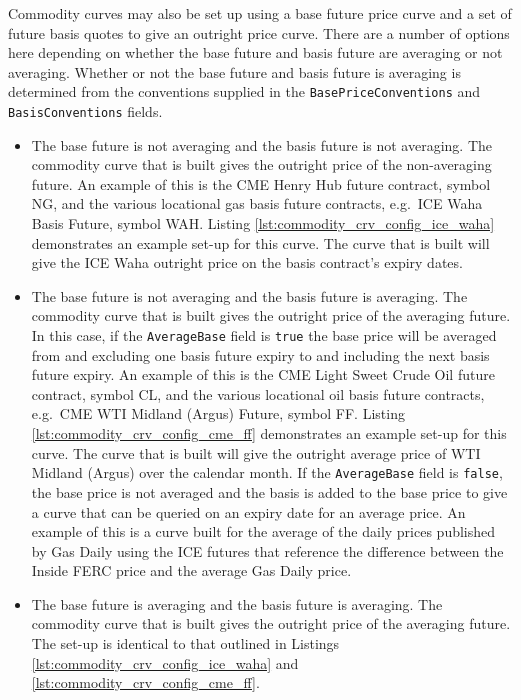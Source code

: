 \documentclass[12pt, a4paper]{article}
\begin{document}
{{Commodity curves may also be set up using a base future price curve and a set of future basis quotes to give an outright price curve. There are a number of options here depending on whether the base future and basis future are averaging or not averaging. Whether or not the base future and basis future is averaging is determined from the conventions supplied in the \lstinline!BasePriceConventions! and \lstinline!BasisConventions! fields. 
\begin{itemize}
\item
The base future is not averaging and the basis future is not averaging. The commodity curve that is built gives the outright price of the non-averaging future. An example of this is the CME Henry Hub future contract, symbol NG, and the various locational gas basis future contracts, e.g.\ ICE Waha Basis Future, symbol WAH. Listing \ref{lst:commodity_crv_config_ice_waha} demonstrates an example set-up for this curve. The curve that is built will give the ICE Waha outright price on the basis contract's expiry dates.

\item
The base future is not averaging and the basis future is averaging. The commodity curve that is built gives the outright price of the averaging future. In this case, if the \lstinline!AverageBase! field is \lstinline!true! the base price will be averaged from and excluding one basis future expiry to and including the next basis future expiry. An example of this is the CME Light Sweet Crude Oil future contract, symbol CL, and the various locational oil basis future contracts, e.g.\ CME WTI Midland (Argus) Future, symbol FF. Listing \ref{lst:commodity_crv_config_cme_ff} demonstrates an example set-up for this curve. The curve that is built will give the outright average price of WTI Midland (Argus) over the calendar month. If the \lstinline!AverageBase! field is \lstinline!false!, the base price is not averaged and the basis is added to the base price to give a curve that can be queried on an expiry date for an average price. An example of this is a curve built for the average of the daily prices published by Gas Daily using the ICE futures that reference the difference between the Inside FERC price and the average Gas Daily price.

\item
The base future is averaging and the basis future is averaging. The commodity curve that is built gives the outright price of the averaging future. The set-up is identical to that outlined in Listings \ref{lst:commodity_crv_config_ice_waha} and \ref{lst:commodity_crv_config_cme_ff}.


\end{itemize}}}
\end{document}
